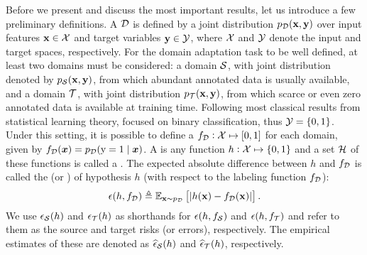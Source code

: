 Before we present and discuss the most important results, let us introduce a few preliminary definitions. A  ${\mathcal{D}}$ is defined by a joint distribution $p_{\mathcal{D}}({\mathbf{x}}, {\mathbf{y}})$ over input features ${\mathbf{x}} \in {\mathcal{X}}$ and target variables ${\mathbf{y}} \in {\mathcal{Y}}$, where ${\mathcal{X}}$ and ${\mathcal{Y}}$ denote the input and target spaces, respectively. For the domain adaptation task to be well defined, at least two domains must be considered: a  domain ${\mathcal{S}}$, with joint distribution denoted by $p_{\mathcal{S}}({\mathbf{x}}, {\mathbf{y}})$, from which abundant annotated data is usually available, and a  domain ${\mathcal{T}}$, with joint distribution $p_{\mathcal{T}}({\mathbf{x}}, {\mathbf{y}})$, from which scarce or even zero annotated data is available at training time. Following most classical results from statistical learning theory, \citet{BenDavid2010} focused on binary classification, thus ${\mathcal{Y}} = \{0, 1\}$. Under this setting, it is possible to define a  $f_{\mathcal{D}}: {\mathcal{X}} \mapsto [0, 1]$ for each domain, given by $f_{\mathcal{D}}({\bm{x}}) = p_{\mathcal{D}}({\textnormal{y}}=1 \mid {\bm{x}})$. A  is any function $h: {\mathcal{X}} \mapsto \{0,1\}$ and a set ${\mathcal{H}}$ of these functions is called a . The expected absolute difference between $h$ and $f_{\mathcal{D}}$ is called the  (or ) of hypothesis $h$ (with respect to the labeling function $f_{\mathcal{D}}$):
\begin{equation}
    \label{eq:risk}
    \epsilon(h,f_{\mathcal{D}}) \triangleq \mathbb{E}_{{\mathbf{x}} \sim p_{\mathcal{D}}} \left[|h({\mathbf{x}}) - f_{\mathcal{D}}({\mathbf{x}})|\right].
\end{equation}
We use $\epsilon_{\mathcal{S}}(h)$ and $\epsilon_{\mathcal{T}}(h)$ as shorthands for $\epsilon(h,f_{\mathcal{S}})$ and $\epsilon(h,f_{\mathcal{T}})$ and refer to them as the source and target risks (or errors), respectively. The empirical estimates of these are denoted as $\widehat{\epsilon}_{\mathcal{S}}(h)$ and $\widehat{\epsilon}_{\mathcal{T}}(h)$, respectively.

